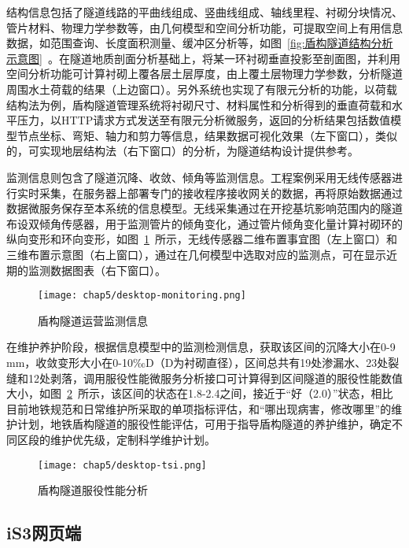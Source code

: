 结构信息包括了隧道线路的平曲线组成、竖曲线组成、轴线里程、衬砌分块情况、管片材料、物理力学参数等，由几何模型和空间分析功能，可提取空间上有用信息数据，如范围查询、长度面积测量、缓冲区分析等，如图~\ref{fig:盾构隧道结构分析示意图}~。在隧道地质剖面分析基础上，将某一环衬砌垂直投影至剖面图，并利用空间分析功能可计算衬砌上覆各层土层厚度，由上覆土层物理力学参数，分析隧道周围水土荷载的结果（上边窗口）。另外系统也实现了有限元分析的功能，以荷载结构法为例，盾构隧道管理系统将衬砌尺寸、材料属性和分析得到的垂直荷载和水平压力，以HTTP请求方式发送至有限元分析微服务，返回的分析结果包括数值模型节点坐标、弯矩、轴力和剪力等信息，结果数据可视化效果（左下窗口），类似的，可实现地层结构法（右下窗口）的分析，为隧道结构设计提供参考。

监测信息则包含了隧道沉降、收敛、倾角等监测信息。工程案例采用无线传感器进行实时采集，在服务器上部署专门的接收程序接收网关的数据，再将原始数据通过数据微服务保存至本系统的信息模型。无线采集通过在开挖基坑影响范围内的隧道布设双倾角传感器，用于监测管片的倾角变化，通过管片倾角变化量计算衬砌环的纵向变形和环向变形，如图~\ref{fig:盾构隧道运营监测信息}~所示，无线传感器二维布置事宜图（左上窗口）和三维布置示意图（右上窗口），通过在几何模型中选取对应的监测点，可在显示近期的监测数据图表（右下窗口）。

\begin{figure}[htb!]
    \centering
    \texttt{[image: chap5/desktop-monitoring.png]}
    \caption{盾构隧道运营监测信息}
    \label{fig:盾构隧道运营监测信息}
\end{figure}

在维护养护阶段，根据信息模型中的监测检测信息，获取该区间的沉降大小在0-9 mm，收敛变形大小在0-10‰D（D为衬砌直径），区间总共有19处渗漏水、23处裂缝和12处剥落，调用服役性能微服务分析接口可计算得到区间隧道的服役性能数值大小，如图~\ref{fig:盾构隧道服役性能分析}~所示，该区间的状态在1.8-2.4之间，接近于“好（2.0）”状态，相比目前地铁规范和日常维护所采取的单项指标评估，和“哪出现病害，修改哪里”的维护计划，地铁盾构隧道的服役性能评估，可用于指导盾构隧道的养护维护，确定不同区段的维护优先级，定制科学维护计划。

\begin{figure}[htb!]
    \centering
    \texttt{[image: chap5/desktop-tsi.png]}
    \caption{盾构隧道服役性能分析}
    \label{fig:盾构隧道服役性能分析}
\end{figure}

\subsection{iS3网页端}

